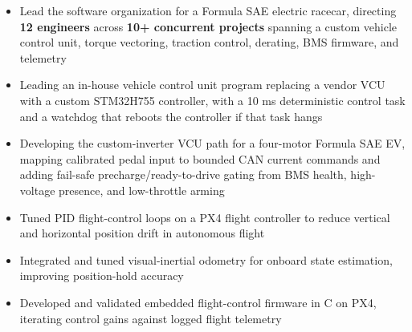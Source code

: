 \documentclass[10pt,letterpaper]{article}
\begin{document}
\bodyfont

\resumeheader
\educationsection




\orgline{\spartanracing}
\begin{itemize}
  \item Lead the software organization for a Formula SAE electric racecar, directing \textbf{12 engineers} across \textbf{10+ concurrent projects} spanning a custom vehicle control unit, torque vectoring, traction control, derating, BMS firmware, and telemetry
  \item Leading an in-house vehicle control unit program replacing a vendor VCU with a custom STM32H755 controller, with a 10 ms deterministic control task and a watchdog that reboots the controller if that task hangs
  \item Developing the custom-inverter VCU path for a four-motor Formula SAE EV, mapping calibrated pedal input to bounded CAN current commands and adding fail-safe precharge/ready-to-drive gating from BMS health, high-voltage presence, and low-throttle arming
\end{itemize}

\entryspace

\begin{itemize}
  \item Tuned PID flight-control loops on a PX4 flight controller to reduce vertical and horizontal position drift in autonomous flight
  \item Integrated and tuned visual-inertial odometry for onboard state estimation, improving position-hold accuracy
  \item Developed and validated embedded flight-control firmware in C on PX4, iterating control gains against logged flight telemetry
\end{itemize}
\end{document}
